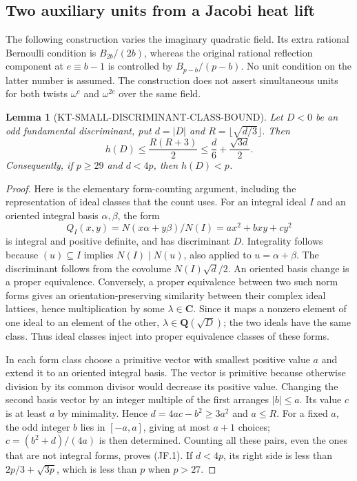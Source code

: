 \documentclass[11pt,a4paper]{article}
\newtheorem{lemma}[theorem]{Lemma}
\theoremstyle{definition}
\begin{document}


\subsection{Two auxiliary units from a Jacobi heat lift}
\label{sec:kt-jacobi-fields}

The following construction varies the imaginary quadratic field.  Its
extra rational Bernoulli condition is $B_{2b}/(2b)$, whereas the
original rational reflection component at $e\equiv b-1$ is controlled
by $B_{p-b}/(p-b)$.  No unit condition on the latter number is assumed.
The construction does not assert simultaneous units for both twists
$\omega^e$ and $\omega^{2e}$ over the same field.

\begin{lemma}[KT-SMALL-DISCRIMINANT-CLASS-BOUND]
Let $D<0$ be an odd fundamental discriminant, put $d=|D|$ and
$R=\lfloor\sqrt{d/3}\rfloor$.  Then
\[
 h(D)\leq\frac{R(R+3)}2
       \leq\frac d6+\frac{\sqrt{3d}}2.                 \tag{JF.1}
\]
Consequently, if $p\geq29$ and $d<4p$, then $h(D)<p$.
\end{lemma}
\begin{proof}
Here is the elementary form-counting argument, including the
representation of ideal classes that the count uses.  For an integral
ideal $I$ and an oriented integral basis $\alpha,\beta$, the form
\[
 Q_I(x,y)=N(x\alpha+y\beta)/N(I)=ax^2+bxy+cy^2
\]
is integral and positive definite, and has discriminant $D$.
Integrality follows because $(u)\subseteq I$ implies $N(I)\mid N(u)$,
also applied to $u=\alpha+\beta$.  The discriminant follows from
the covolume $N(I)\sqrt d/2$.  An oriented basis change is a proper
equivalence.  Conversely, a proper equivalence between two such norm
forms gives an orientation-preserving similarity between their complex
ideal lattices, hence multiplication by some $\lambda\in\mathbf C$.
Since it maps a nonzero element of one ideal to an element of the other,
$\lambda\in\mathbf Q(\sqrt D)$; the two ideals have the same class.
Thus ideal classes inject into proper equivalence classes of these forms.

In each form class choose a primitive vector with smallest positive
value $a$ and extend it to an oriented integral basis.  The vector is
primitive because otherwise division by its common divisor would
decrease its positive value.  Changing the second basis vector by an
integer multiple of the first arranges $|b|\leq a$.  Its value $c$ is
at least $a$ by minimality.  Hence $d=4ac-b^2\geq3a^2$ and $a\leq R$.
For a fixed $a$, the odd integer $b$ lies in $[-a,a]$, giving at most
$a+1$ choices; $c=(b^2+d)/(4a)$ is then determined.  Counting all these
pairs, even the ones that are not integral forms, proves (JF.1).
If $d<4p$, its right side is less than $2p/3+\sqrt{3p}$, which is
less than $p$ when $p>27$.
\end{proof}
\end{document}
